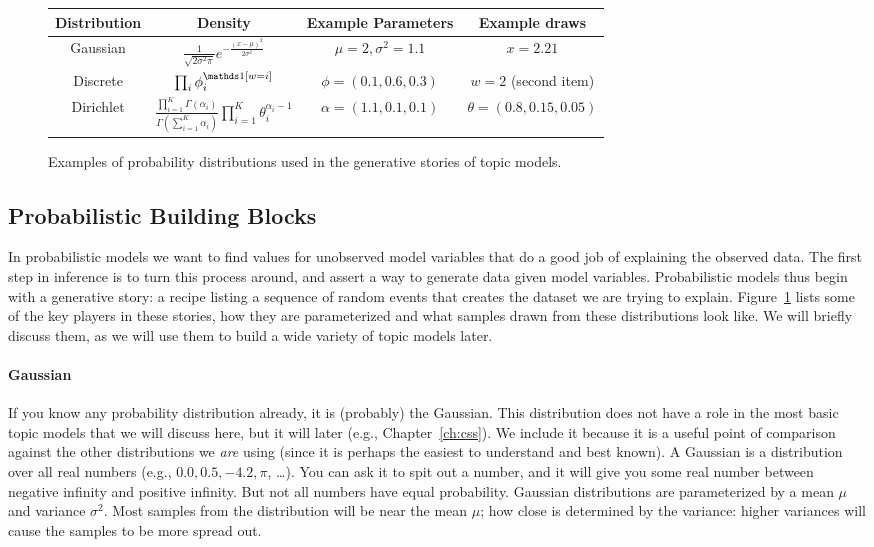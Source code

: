 \begin{figure}
\small
  \begin{tabular}{cccc}
    Distribution & Density & Example Parameters & Example draws \\
    \hline
    Gaussian  & $\frac{1}{\sqrt{2 \sigma^2 \pi}} e^{- \frac{(x-\mu)^2}{2 \sigma^2}}$ & $\mu=2, \sigma^2=1.1$ & $x=2.21$\\
    Discrete  & $\prod_i \phi_i^{\ind{w=i}}$ & $\phi=(0.1, 0.6, 0.3)$
                                                & $w=2$ (second
                                                  item) \\
   Dirichlet & $\frac{\prod_{i=1}^K \Gamma(\alpha_i)}{\Gamma \left( \sum_{i=1}^K \alpha_i \right)} \prod_{i=1}^K \theta_i^{\alpha_i - 1} $ & $\alpha = (1.1, 0.1, 0.1)$  & $\theta = (0.8, 0.15, 0.05)$ \\
     \hline
  \end{tabular}
  \caption{Examples of probability distributions used in the
    generative stories of topic models.}
  \label{fig:distribution_examples}
\end{figure}



\subsection{Probabilistic Building Blocks}
\label{sec:intro_building_blocks}

In probabilistic models we want to find values for unobserved model variables that do a good job of explaining the observed data.
The first step in inference is to turn this process around, and assert a way to generate data given model variables.
Probabilistic models thus begin with a generative story: a recipe listing a sequence of random events
that creates the dataset we are trying to explain.
Figure~\ref{fig:distribution_examples} lists some of the key players in these
stories, how they are parameterized and what samples drawn from these distributions look like.  We will
briefly discuss them, as we will use them to build a wide variety of topic models
later.

\paragraph{Gaussian} If you know any probability distribution already,
it is (probably) the
Gaussian.  This distribution does not have a role in the most basic topic models that we will
discuss here, but it will later (e.g., Chapter~\ref{ch:css}).  We
include it because it is a useful point of comparison against the other
distributions we {\em are} using (since it is perhaps the easiest to understand and best
known). A Gaussian is a distribution over all real numbers (e.g., $0.0, 0.5,
-4.2, \pi$, \dots).  You can ask it to spit out a number, and it will give you
some real number between negative infinity and positive infinity.  But not all
numbers have equal probability.  Gaussian distributions are parameterized by a
mean $\mu$ and variance $\sigma^2$.  Most samples from the distribution will be
near the mean $\mu$; how close is determined by the variance: higher variances
will cause the samples to be more spread out.

